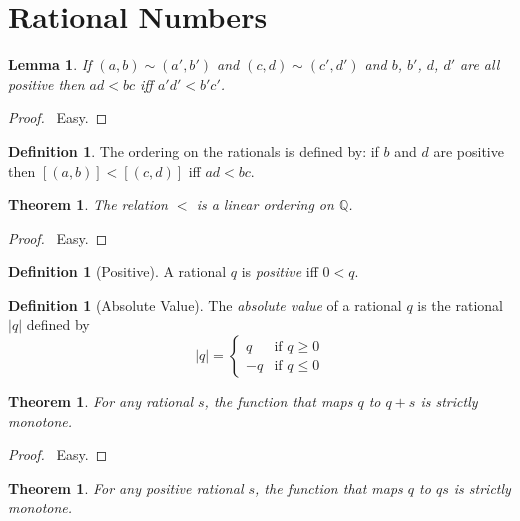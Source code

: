\documentclass{article}
\let\qed\relax
\newtheorem{lemma}[axiom]{Lemma}
\newtheorem{theorem}[axiom]{Theorem}
\theoremstyle{definition}
\newtheorem{definition}[axiom]{Definition}
\begin{document}
    \section{Rational Numbers}

    \begin{lemma}
        If $(a,b) \sim (a',b')$ and $(c,d) \sim (c',d')$ and $b$, $b'$, $d$, $d'$
        are all positive then $ad<bc$ iff $a'd'<b'c'$.
    \end{lemma}

    \begin{proof}
        \pf\ Easy.
    \end{proof}

    \begin{definition}
        The ordering on the rationals is defined by: if $b$ and $d$ are positive then
        $[(a,b)] < [(c,d)]$ iff $ad < bc$.
    \end{definition}

    \begin{theorem}
        The relation $<$ is a linear ordering on $\mathbb{Q}$.
    \end{theorem}

    \begin{proof}
        \pf\ Easy. \qed
    \end{proof}

    \begin{definition}[Positive]
        A rational $q$ is \emph{positive} iff $0 < q$.
    \end{definition}

    \begin{definition}[Absolute Value]
        The \emph{absolute value} of a rational $q$ is the rational $|q|$ defined by
        \[ |q| = \begin{cases}
            q & \text{if } q \geq 0 \\
            -q & \text{if } q \leq 0
        \end{cases} \]
    \end{definition}

    \begin{theorem}
        For any rational $s$, the function that maps $q$ to $q + s$ is strictly monotone.
    \end{theorem}
    
    \begin{proof}
        \pf\ Easy. \qed
    \end{proof}

    \begin{theorem}
        For any positive rational $s$, the function that maps $q$ to $qs$ is strictly monotone.
    \end{theorem}
\end{document}
